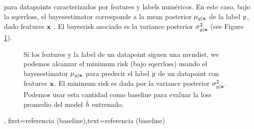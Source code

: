 {{{{para \gls{datapoint}s caracterizados por \gls{feature}s y \gls{label}s numéricos.
En este caso, bajo la \gls{sqerrloss}, el \gls{bayesestimator} corresponde a la \gls{mean} posterior
$\mu_{y|{\bf x}}$ de la \gls{label} $y$, dado  
\gls{feature}s ${\bf x}$ \cite{LC,GrayProbBook}. El \gls{bayesrisk} asociado es la 
\gls{variance} posterior
$\sigma^{2}_{y|{\bf x}}$ (see Figure \ref{fig_post_baseline_dict}).
	\begin{figure}[H]
		\begin{center}
		\end{center}
		\caption{Si los \gls{feature}s y la  \gls{label} de un \gls{datapoint} siguen una \gls{mvndist}, we 
		podemos alcanzar el \gls{minimum} \gls{risk} (bajo \gls{sqerrloss}) usando el \gls{bayesestimator} $\mu_{y|{\bf x}}$ 
		para predecir el \gls{label} $y$ de un \gls{datapoint} con \gls{feature}s ${\bf x}$. El
		\gls{minimum} \gls{risk} es dada por la \gls{variance} posterior $\sigma^{2}_{y|{\bf x}}$. Podemos 
		usar esta cantidad como baseline para evaluar la \gls{loss} promedio del \gls{model} $\hat{h}$ entrenado. \label{fig_post_baseline_dict}}
	\end{figure}},
    first={referencia (baseline)},text={referencia (baseline)}
}

}}
